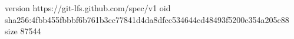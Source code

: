 version https://git-lfs.github.com/spec/v1
oid sha256:4fbb455fbbbf6b761b3cc77841d4da8dfcc534644cd48493f5200c354a205c88
size 87544

